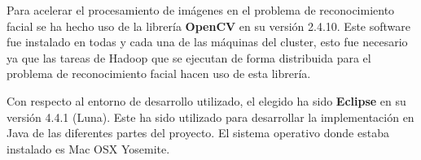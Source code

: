 Para acelerar el procesamiento de imágenes en el problema de reconocimiento facial se ha hecho uso de la librer\'ia \textbf{OpenCV} en su versi\'on 2.4.10. Este software fue instalado en todas y cada una de las m\'aquinas del cluster, esto fue necesario ya que las tareas de Hadoop que se ejecutan de forma distribuida para el problema de reconocimiento facial hacen uso de esta librer\'ia.

Con respecto al entorno de desarrollo utilizado, el elegido ha sido \textbf{Eclipse} en su versi\'on 4.4.1 (Luna). Este ha sido utilizado para desarrollar la implementaci\'on en Java de las diferentes partes del proyecto. El sistema operativo donde estaba instalado es Mac OSX Yosemite.









